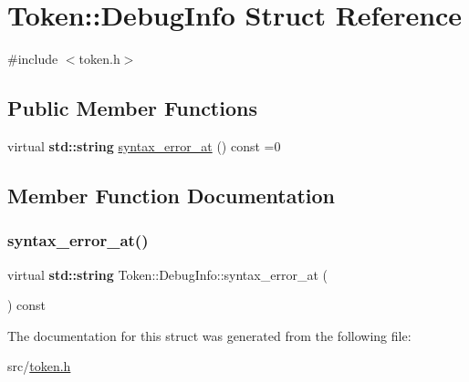 \hypertarget{struct_token_1_1_debug_info}{}\section{Token\+:\+:Debug\+Info Struct Reference}
\label{struct_token_1_1_debug_info}


{\ttfamily \#include $<$token.\+h$>$}

\subsection*{Public Member Functions}
\begin{DoxyCompactItemize}
\item 
virtual \textbf{ std\+::string} \hyperlink{struct_token_1_1_debug_info_a4d66aa65422c236198bbcc616bba250f}{syntax\+\_\+error\+\_\+at} () const =0
\end{DoxyCompactItemize}


\subsection{Member Function Documentation}
\mbox{\label{struct_token_1_1_debug_info_a4d66aa65422c236198bbcc616bba250f}} 
\subsubsection{\texorpdfstring{syntax\+\_\+error\+\_\+at()}{syntax\_error\_at()}}
{\footnotesize\ttfamily virtual \textbf{ std\+::string} Token\+::\+Debug\+Info\+::syntax\+\_\+error\+\_\+at (\begin{DoxyParamCaption}{ }\end{DoxyParamCaption}) const\hspace{0.3cm}{\ttfamily [pure virtual]}}



The documentation for this struct was generated from the following file\+:\begin{DoxyCompactItemize}
\item 
src/\hyperlink{token_8h}{token.\+h}\end{DoxyCompactItemize}
